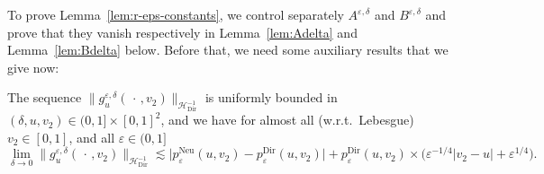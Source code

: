 \documentclass[AHL,Unicode,longabstracts]{cedram}
\DeclareMathOperator{\Dir}{Dir}
\DeclareMathOperator{\Neu}{Neu}
\newcommand{\mc}[1]{{\mathcal #1}}
\renewcommand{\mc}[1]{{\mathcal #1}}
\begin{document}
To prove Lemma~\ref{lem:r-eps-constants}, we control separately $A^{\varepsilon, \delta}$ and $B^{\varepsilon,\delta}$ and prove that they vanish respectively in Lemma~\ref{lem:Adelta} and Lemma~\ref{lem:Bdelta} below. Before that, we need some auxiliary results that we give now:

\begin{lemm}\label{lem:g-bound}
The sequence $\| g^{\varepsilon, \delta}_u (\,\cdot\,, v_2)\|_{\mc H_{\Dir}^{- 1}}$ is uniformly bounded in $(\delta, u, v_2) \!\in (0,1] \times [0,1]^2$, and we have for almost all (w.r.t.~Lebesgue) $v_2 \in [0,1]$, and all $\varepsilon \in (0,1]$
\[
\lim_{\delta \rightarrow 0} \big\| g^{\varepsilon, \delta}_u (\,\cdot\,, v_2)
\big\|_{\mc H_{\Dir}^{- 1}} \lesssim \big| p^{\Neu}_{\varepsilon} (u, v_2) - p^{\Dir}_{\varepsilon} (u, v_2) \big| + p^{\Dir}_{\varepsilon} (u, v_2) \times \big(\varepsilon^{- 1/4} | v_2 - u | + \varepsilon^{1/4} \big).
\]
\end{lemm}
\end{document}
